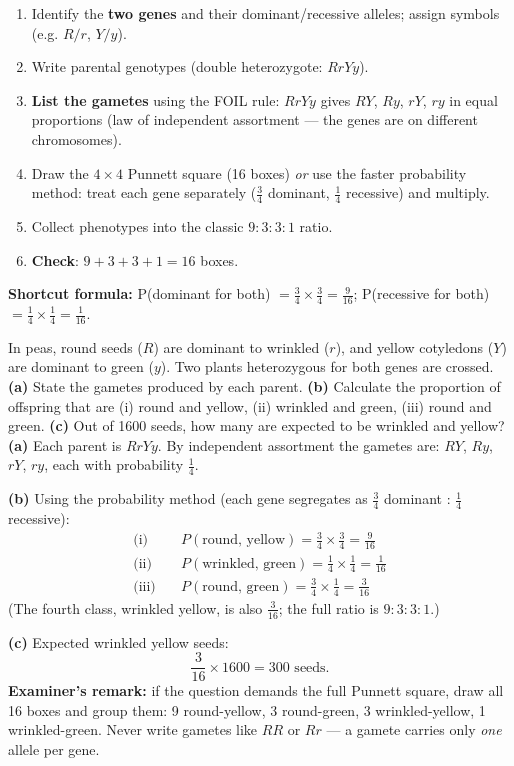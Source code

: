 \documentclass[11pt]{article}
\begin{document}
\begin{methode}
\begin{enumerate}
\item Identify the \textbf{two genes} and their dominant/recessive alleles; assign symbols (e.g. $R/r$, $Y/y$).
\item Write parental genotypes (double heterozygote: $RrYy$).
\item \textbf{List the gametes} using the FOIL rule: $RrYy$ gives $RY$, $Ry$, $rY$, $ry$ in equal proportions (law of independent assortment — the genes are on different chromosomes).
\item Draw the $4 \times 4$ Punnett square (16 boxes) \emph{or} use the faster probability method: treat each gene separately ($\tfrac{3}{4}$ dominant, $\tfrac{1}{4}$ recessive) and multiply.
\item Collect phenotypes into the classic $9:3:3:1$ ratio.
\item \textbf{Check}: $9+3+3+1 = 16$ boxes.
\end{enumerate}
\textbf{Shortcut formula:} P(dominant for both) $= \tfrac{3}{4}\times\tfrac{3}{4} = \tfrac{9}{16}$; P(recessive for both) $= \tfrac{1}{4}\times\tfrac{1}{4} = \tfrac{1}{16}$.
\end{methode}

\begin{exoresolu}
In peas, round seeds ($R$) are dominant to wrinkled ($r$), and yellow cotyledons ($Y$) are dominant to green ($y$). Two plants heterozygous for both genes are crossed. \textbf{(a)} State the gametes produced by each parent. \textbf{(b)} Calculate the proportion of offspring that are (i) round and yellow, (ii) wrinkled and green, (iii) round and green. \textbf{(c)} Out of 1600 seeds, how many are expected to be wrinkled and yellow?
\tcblower
\textbf{(a)} Each parent is $RrYy$. By independent assortment the gametes are: $RY$, $Ry$, $rY$, $ry$, each with probability $\tfrac{1}{4}$.\par
\textbf{(b)} Using the probability method (each gene segregates as $\tfrac{3}{4}$ dominant : $\tfrac{1}{4}$ recessive):
\begin{align*}
\text{(i)}\quad &P(\text{round, yellow}) = \frac{3}{4}\times\frac{3}{4} = \frac{9}{16}\\
\text{(ii)}\quad &P(\text{wrinkled, green}) = \frac{1}{4}\times\frac{1}{4} = \frac{1}{16}\\
\text{(iii)}\quad &P(\text{round, green}) = \frac{3}{4}\times\frac{1}{4} = \frac{3}{16}
\end{align*}
(The fourth class, wrinkled yellow, is also $\tfrac{3}{16}$; the full ratio is $9:3:3:1$.)\par
\textbf{(c)} Expected wrinkled yellow seeds:
\[ \frac{3}{16}\times 1600 = 300 \text{ seeds.} \]
\textbf{Examiner's remark:} if the question demands the full Punnett square, draw all 16 boxes and group them: 9 round-yellow, 3 round-green, 3 wrinkled-yellow, 1 wrinkled-green. Never write gametes like $RR$ or $Rr$ — a gamete carries only \emph{one} allele per gene.
\end{exoresolu}
\end{document}
